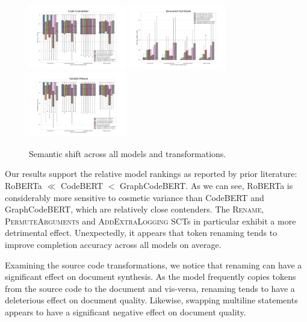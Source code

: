\documentclass[usenames,dvipsnames]{article} %
\begin{document}
  \vspace{-10pt}\begin{figure}[H]
                  \centering\hspace*{-0.6cm}
                  \includegraphics[width=0.38\textwidth]{figs/Code Completion}\hspace*{-0.6cm}
                  \includegraphics[width=0.38\textwidth]{figs/Document Synthesis}\hspace*{-0.6cm}
                  \includegraphics[width=0.38\textwidth]{figs/Variable Misuse}
                  \caption{Semantic shift across all models and transformations.}
                  \label{fig:dataflow}
  \end{figure}

  Our results support the relative model rankings as reported by prior literature: RoBERTa $\ll$ CodeBERT $<$ GraphCodeBERT. As we can see, RoBERTa is considerably more sensitive to cosmetic variance than CodeBERT and GraphCodeBERT, which are relatively close contenders. The \textsc{Rename}, \textsc{PermuteArguments} and  \textsc{AddExtraLogging} SCTs in particular exhibit a more detrimental effect. Unexpectedly, it appears that token renaming tends to improve completion accuracy across all models on average.

  Examining the source code transformations, we notice that renaming can have a significant effect on document synthesis. As the model frequently copies tokens from the source code to the document and vis-versa, renaming tends to have a deleterious effect on document quality. Likewise, swapping multiline statements appears to have a significant negative effect on document quality.
\end{document}
